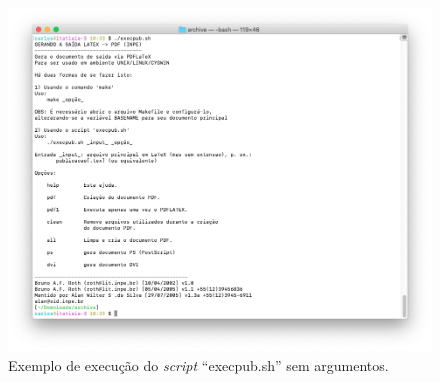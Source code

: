 \begin{figure}[H]
    \centering
    \includegraphics[scale=0.4]{./figs/saida_execpub.png}
    \caption{Exemplo de execução do \textit{script} ``execpub.sh'' sem argumentos.}
    \label{fig:execpub}
\end{figure}

%
%
%
%
%
%
%
%
%
%
%
%
%
%

